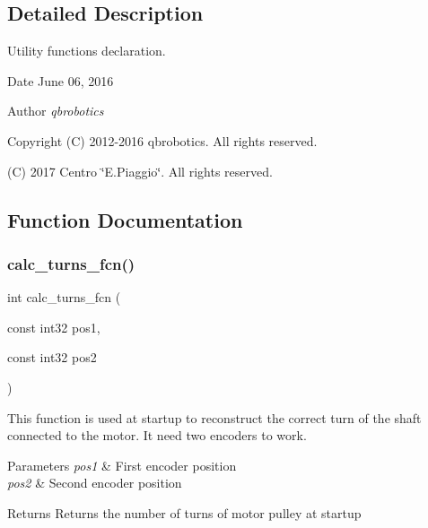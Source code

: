 \subsection{Detailed Description}
Utility functions declaration. 

\begin{DoxyDate}{Date}
June 06, 2016 
\end{DoxyDate}
\begin{DoxyAuthor}{Author}
{\itshape qbrobotics} 
\end{DoxyAuthor}
\begin{DoxyCopyright}{Copyright}
(C) 2012-\/2016 qbrobotics. All rights reserved. 

(C) 2017 Centro \char`\"{}\+E.\+Piaggio\char`\"{}. All rights reserved. 
\end{DoxyCopyright}


\subsection{Function Documentation}
\mbox{\label{utils_8h_afa68f255d25478e463690f63d529c29d}} 
\subsubsection{calc\+\_\+turns\+\_\+fcn()}
{\footnotesize\ttfamily int calc\+\_\+turns\+\_\+fcn (\begin{DoxyParamCaption}\item[{const int32}]{pos1,  }\item[{const int32}]{pos2 }\end{DoxyParamCaption})}

This function is used at startup to reconstruct the correct turn of the shaft connected to the motor. It need two encoders to work.


\begin{DoxyParams}{Parameters}
{\em pos1} & First encoder position \\
\hline
{\em pos2} & Second encoder position\\
\hline
\end{DoxyParams}
\begin{DoxyReturn}{Returns}
Returns the number of turns of motor pulley at startup 
\end{DoxyReturn}
\mbox{\label{utils_8h_a6d9dc88d64cd1f74a30fd0e404a3bb31}} 
